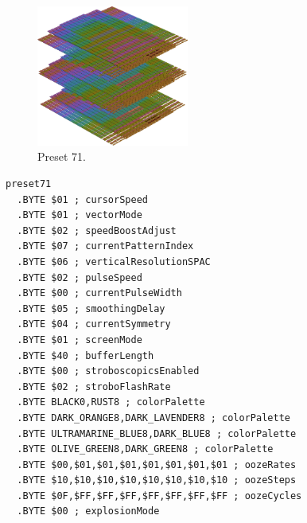 \vspace*{-0.5cm}
\begin{minipage}[b]{0.48\linewidth}
\begin{figure}[H]                                                          
  \centering                                                             
  \begin{adjustbox}{width=5cm,center}                                   
  \includegraphics[width=5cm]{src/colorspace_presets/preset71-45.png}%
  \end{adjustbox}                                                        
\caption*{Preset 71.}                                           
\end{figure}                                                               
\end{minipage}
\hspace{0.1cm}
\begin{minipage}[b]{0.48\linewidth}                                                                         
\begin{lstlisting}[basicstyle=\ttfamily\tiny]
preset71
  .BYTE $01 ; cursorSpeed
  .BYTE $01 ; vectorMode
  .BYTE $02 ; speedBoostAdjust
  .BYTE $07 ; currentPatternIndex
  .BYTE $06 ; verticalResolutionSPAC
  .BYTE $02 ; pulseSpeed
  .BYTE $00 ; currentPulseWidth
  .BYTE $05 ; smoothingDelay
  .BYTE $04 ; currentSymmetry
  .BYTE $01 ; screenMode
  .BYTE $40 ; bufferLength
  .BYTE $00 ; stroboscopicsEnabled
  .BYTE $02 ; stroboFlashRate
  .BYTE BLACK0,RUST8 ; colorPalette
  .BYTE DARK_ORANGE8,DARK_LAVENDER8 ; colorPalette
  .BYTE ULTRAMARINE_BLUE8,DARK_BLUE8 ; colorPalette
  .BYTE OLIVE_GREEN8,DARK_GREEN8 ; colorPalette
  .BYTE $00,$01,$01,$01,$01,$01,$01,$01 ; oozeRates
  .BYTE $10,$10,$10,$10,$10,$10,$10,$10 ; oozeSteps
  .BYTE $0F,$FF,$FF,$FF,$FF,$FF,$FF,$FF ; oozeCycles
  .BYTE $00 ; explosionMode
\end{lstlisting}
\end{minipage}


